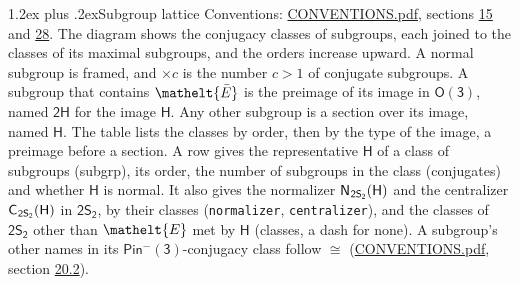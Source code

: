 \documentclass[10pt,a4paper]{article}
\makeatletter
\renewcommand\section{\@startsection{section}{1}{\z@}{-3ex plus -1ex minus -.2ex}%
  {1.2ex plus .2ex}{\normalfont\large\sffamily\bfseries\color{parttitle}}}
\numberwithin{equation}{section}
\newcommand{\eltfont}[1]{{\let\sigma\eltsigma\mathelt{#1}}}
\newcommand{\grp}[1]{\mathsf{#1}}
\newcommand{\cls}[1]{\eltfont{#1}}
\newcommand{\elt}[1]{\eltfont{#1}}
\newcommand{\samecls}{\cong}
\newcommand{\barred}[1]{\bar{#1}}
\newcommand{\secondclass}{\mathrm{b}}
\newcommand{\hairsp}{\mkern1mu}
\makeatother
\begin{document}
\section{Subgroup lattice}\label{s:subgroups}
Conventions: \href{../../CONVENTIONS.pdf}{CONVENTIONS.pdf}, sections \href{../../../rotation/CONVENTIONS.pdf\#conv.15}{15} and \href{../../CONVENTIONS.pdf\#conv.28}{28}.
The diagram shows the conjugacy classes of subgroups, each joined to the classes of its maximal subgroups, and the orders increase upward. \label{n:index.conjugates.c}A normal subgroup is framed, and ${\times}c$ is the number $c > 1$ of conjugate subgroups. \label{n:group.H}A subgroup that contains $\elt{\barred{E}}$ is the preimage of its image in $\grp{O(3)}$, named $\grp{2H}$ for the image $\grp{H}$. Any other subgroup is a section over its image, named $\grp{H}$. The table lists the classes by order, then by the type of the image, a preimage before a section. \label{n:head.subgroup}\label{n:head.order}\label{n:head.conjugates}\label{n:head.normal}A row gives the representative $\grp{H}$ of a class of subgroups (subgrp), its order, the number of subgroups in the class (conjugates) and whether $\grp{H}$ is normal. \label{n:group.normalizer}\label{n:group.centralizer}\label{n:head.classes}It also gives the normalizer $\grp{N}_{\hairsp \grp{2S_{2}}}(\grp{H})$ and the centralizer $\grp{C}_{\hairsp \grp{2S_{2}}}(\grp{H})$ in $\grp{2S_{2}}$, by their classes (\texttt{normalizer}, \texttt{centralizer}), and the classes of $\grp{2S_{2}}$ other than $\cls{E}$ met by $\grp{H}$ (classes, a dash for none). A subgroup's other names in its \href{Pinminus3.pdf}{$\grp{Pin^{-}(3)}$}-conjugacy class follow $\samecls$ (\href{../../CONVENTIONS.pdf}{CONVENTIONS.pdf}, section \href{../../CONVENTIONS.pdf\#conv.20.2}{20.2}).
\begin{center}
\end{center}
\end{document}
